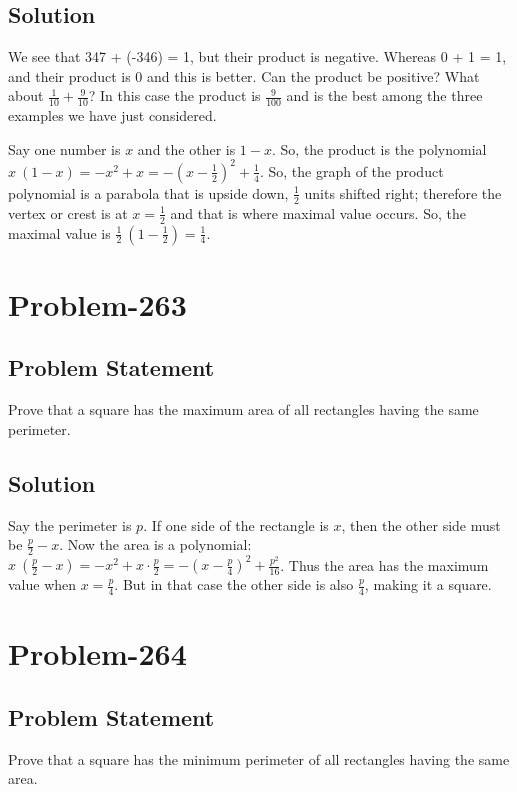 \documentclass[12pt]{article}
\begin{document}
\subsection*{Solution}
We see that 347 + (-346) = 1, but their product is negative. Whereas 0 + 1 = 1, and their product is 0 and this is better. Can the product be positive? What about $\frac{1}{10} + \frac{9}{10}$? In this case the product is $\frac{9}{100}$ and is the best among the three examples we have just considered.

Say one number is $x$ and the other is $1-x$. So, the product is the polynomial $x\ (1-x) = -x^2+x = -\left( x - \frac{1}{2} \right)^2 + \frac{1}{4}$. So, the graph of the product polynomial is a parabola that is upside down, $\frac{1}{2}$ units shifted right; therefore the vertex or crest is at $x = \frac{1}{2}$ and that is where maximal value occurs. So, the maximal value is $\frac{1}{2}\ \left( 1 - \frac{1}{2} \right) = \frac{1}{4}$.

\section*{Problem-263}
\subsection*{Problem Statement}
Prove that a square has the maximum area of all rectangles having the same perimeter.

\subsection*{Solution}
Say the perimeter is $p$. If one side of the rectangle is $x$, then the other side must be $\frac{p}{2} - x$. Now the area is a polynomial:  $x\ \left( \frac{p}{2}-x \right) = -x^2 + x\cdot \frac{p}{2} = -\left( x - \frac{p}{4} \right)^2 + \frac{p^2}{16}$. Thus the area has the maximum value when $x = \frac{p}{4}$. But in that case the other side is also $\frac{p}{4}$, making it a square.

\section*{Problem-264}
\subsection*{Problem Statement}
Prove that a square has the minimum perimeter of all rectangles having the same area.
\end{document}

